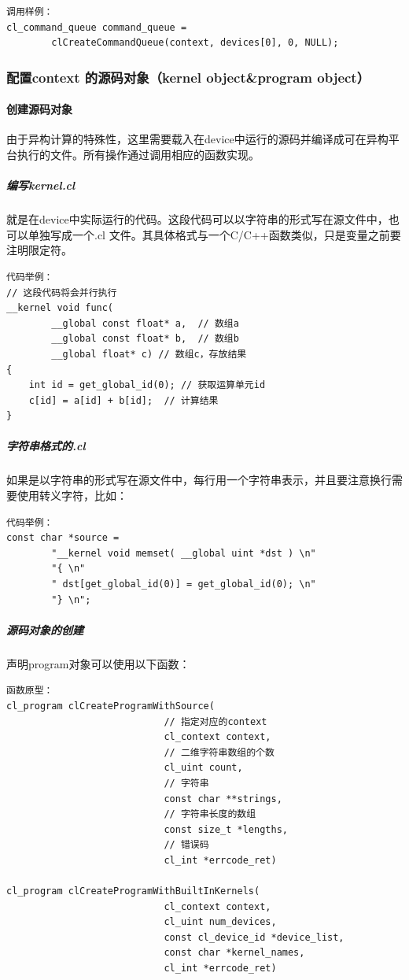 \documentclass{ctexart}
\begin{document}
\begin{verbatim}
调用样例：
cl_command_queue command_queue =
        clCreateCommandQueue(context, devices[0], 0, NULL);
\end{verbatim}


\subsubsection{配置context 的源码对象（kernel object\&program object）}
\paragraph{创建源码对象}
由于异构计算的特殊性，这里需要载入在device中运行的源码并编译成可在异构平台执行的文件。所有操作通过调用相应的函数实现。


\subparagraph{编写kernel.cl}就是在device中实际运行的代码。这段代码可以以字符串的形式写在源文件中，也可以单独写成一个.cl 文件。其具体格式与一个C/C++函数类似，只是变量之前要注明限定符。

\begin{verbatim}
代码举例：
// 这段代码将会并行执行
__kernel void func(
        __global const float* a,  // 数组a
        __global const float* b,  // 数组b
        __global float* c) // 数组c，存放结果
{
    int id = get_global_id(0); // 获取运算单元id
    c[id] = a[id] + b[id];  // 计算结果
}
\end{verbatim}


\subparagraph{字符串格式的.cl}如果是以字符串的形式写在源文件中，每行用一个字符串表示，并且要注意换行需要使用转义字符，比如：
\begin{verbatim}
代码举例：
const char *source =
        "__kernel void memset( __global uint *dst ) \n"
        "{ \n"
        " dst[get_global_id(0)] = get_global_id(0); \n"
        "} \n";
\end{verbatim}


\subparagraph{源码对象的创建}
声明program对象可以使用以下函数：
\begin{verbatim}
函数原型：
cl_program clCreateProgramWithSource(
                            // 指定对应的context
                            cl_context context,
                            // 二维字符串数组的个数
                            cl_uint count,
                            // 字符串
                            const char **strings,
                            // 字符串长度的数组
                            const size_t *lengths,
                            // 错误码
                            cl_int *errcode_ret)

cl_program clCreateProgramWithBuiltInKernels(
                            cl_context context,
                            cl_uint num_devices,
                            const cl_device_id *device_list,
                            const char *kernel_names,
                            cl_int *errcode_ret)
\end{verbatim}
\end{document}
